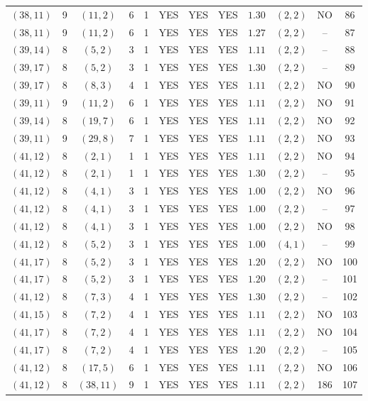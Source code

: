 \begin{longtable}{|c|c|c|c|c|c|c|c|c|c|c|c|}
$(38,11)$ & 9 & $(11,2)$ & 6 & 1 & YES & YES & YES & $1.30$ & $(2,2)$ & NO & 86\\
$(38,11)$ & 9 & $(11,2)$ & 6 & 1 & YES & YES & YES & $1.27$ & $(2,2)$ & -- & 87\\
$(39,14)$ & 8 & $(5,2)$ & 3 & 1 & YES & YES & YES & $1.11$ & $(2,2)$ & -- & 88\\
$(39,17)$ & 8 & $(5,2)$ & 3 & 1 & YES & YES & YES & $1.30$ & $(2,2)$ & -- & 89\\
$(39,17)$ & 8 & $(8,3)$ & 4 & 1 & YES & YES & YES & $1.11$ & $(2,2)$ & NO & 90\\
$(39,11)$ & 9 & $(11,2)$ & 6 & 1 & YES & YES & YES & $1.11$ & $(2,2)$ & NO & 91\\
$(39,14)$ & 8 & $(19,7)$ & 6 & 1 & YES & YES & YES & $1.11$ & $(2,2)$ & NO & 92\\
$(39,11)$ & 9 & $(29,8)$ & 7 & 1 & YES & YES & YES & $1.11$ & $(2,2)$ & NO & 93\\
$(41,12)$ & 8 & $(2,1)$ & 1 & 1 & YES & YES & YES & $1.11$ & $(2,2)$ & NO & 94\\
$(41,12)$ & 8 & $(2,1)$ & 1 & 1 & YES & YES & YES & $1.30$ & $(2,2)$ & -- & 95\\
$(41,12)$ & 8 & $(4,1)$ & 3 & 1 & YES & YES & YES & $1.00$ & $(2,2)$ & NO & 96\\
$(41,12)$ & 8 & $(4,1)$ & 3 & 1 & YES & YES & YES & $1.00$ & $(2,2)$ & -- & 97\\
$(41,12)$ & 8 & $(4,1)$ & 3 & 1 & YES & YES & YES & $1.00$ & $(2,2)$ & NO & 98\\
$(41,12)$ & 8 & $(5,2)$ & 3 & 1 & YES & YES & YES & $1.00$ & $(4,1)$ & -- & 99\\
$(41,17)$ & 8 & $(5,2)$ & 3 & 1 & YES & YES & YES & $1.20$ & $(2,2)$ & NO & 100\\
$(41,17)$ & 8 & $(5,2)$ & 3 & 1 & YES & YES & YES & $1.20$ & $(2,2)$ & -- & 101\\
$(41,12)$ & 8 & $(7,3)$ & 4 & 1 & YES & YES & YES & $1.30$ & $(2,2)$ & -- & 102\\
$(41,15)$ & 8 & $(7,2)$ & 4 & 1 & YES & YES & YES & $1.11$ & $(2,2)$ & NO & 103\\
$(41,17)$ & 8 & $(7,2)$ & 4 & 1 & YES & YES & YES & $1.11$ & $(2,2)$ & NO & 104\\
$(41,17)$ & 8 & $(7,2)$ & 4 & 1 & YES & YES & YES & $1.20$ & $(2,2)$ & -- & 105\\
$(41,12)$ & 8 & $(17,5)$ & 6 & 1 & YES & YES & YES & $1.11$ & $(2,2)$ & NO & 106\\
$(41,12)$ & 8 & $(38,11)$ & 9 & 1 & YES & YES & YES & $1.11$ & $(2,2)$ & 186 & 107\\

\end{longtable}
